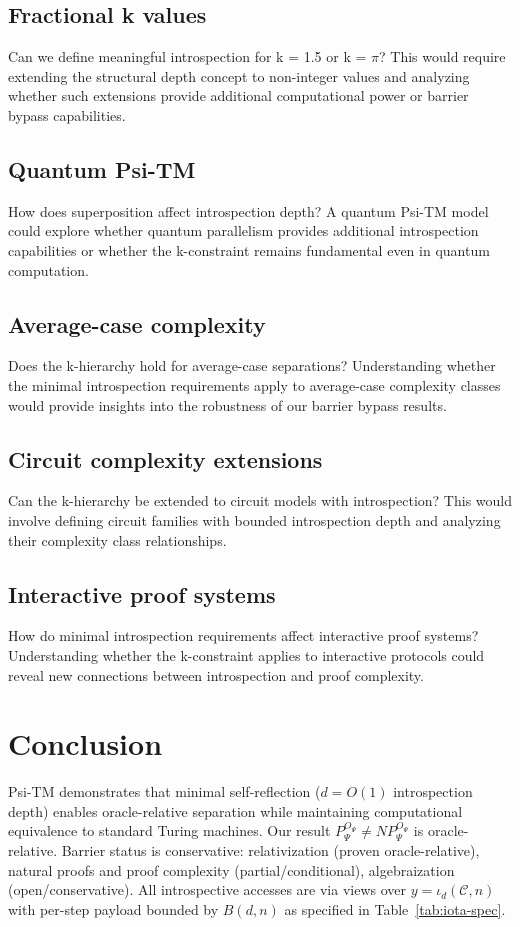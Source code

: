 \documentclass[11pt]{article}
\theoremstyle{plain}
\theoremstyle{definition}
\def\B(#1,#2){B(#1,#2)}
\begin{document}
\subsection{Fractional k values}
Can we define meaningful introspection for k = 1.5 or k = $\pi$? This would require extending the structural depth concept to non-integer values and analyzing whether such extensions provide additional computational power or barrier bypass capabilities.

\subsection{Quantum Psi-TM}
How does superposition affect introspection depth? A quantum Psi-TM model could explore whether quantum parallelism provides additional introspection capabilities or whether the k-constraint remains fundamental even in quantum computation.

\subsection{Average-case complexity}
Does the k-hierarchy hold for average-case separations? Understanding whether the minimal introspection requirements apply to average-case complexity classes would provide insights into the robustness of our barrier bypass results.

\subsection{Circuit complexity extensions}
Can the k-hierarchy be extended to circuit models with introspection? This would involve defining circuit families with bounded introspection depth and analyzing their complexity class relationships.

\subsection{Interactive proof systems}
How do minimal introspection requirements affect interactive proof systems? Understanding whether the k-constraint applies to interactive protocols could reveal new connections between introspection and proof complexity.

\section{Conclusion}

Psi-TM demonstrates that minimal self-reflection ($d = O(1)$ introspection depth) enables oracle-relative separation while maintaining computational equivalence to standard Turing machines. Our result $P^{O_\Psi}_\Psi \neq NP^{O_\Psi}_\Psi$ is oracle-relative. Barrier status is conservative: relativization (proven oracle-relative), natural proofs and proof complexity (partial/conditional), algebraization (open/conservative). All introspective accesses are via views over $y=\iota_d(\mathcal{C},n)$ with per-step payload bounded by $\B(d,n)$ as specified in Table~\ref{tab:iota-spec}.
\end{document}
